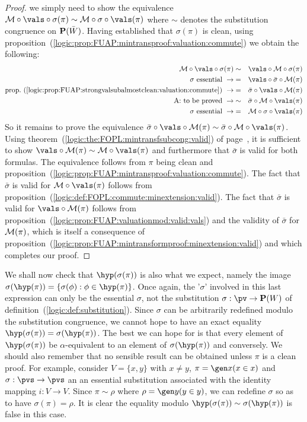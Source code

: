 \begin{proof}
we simply need to show the equivalence ${\cal
M}\circ\vals\circ\sigma(\pi)\sim{\cal M}\circ\sigma\circ\vals(\pi)$
where $\sim$ denotes the substitution congruence on ${\bf
P}(\bar{W})$. Having established that $\sigma(\pi)$ is clean, using
proposition~(\ref{logic:prop:FUAP:mintransproof:valuation:commute})
we obtain the following:
    \begin{eqnarray*}
    {\cal M}\circ\vals\circ\sigma(\pi)&\sim&\vals\circ{\cal
    M}\circ\sigma(\pi)\\
    \mbox{$\sigma$ essential}\ \rightarrow
    &=&\vals\circ\bar{\sigma}\circ{\cal M}(\pi)\\
    \mbox{prop.~(\ref{logic:prop:FUAP:strongvalsubalmostclean:valuation:commute})}\ \rightarrow
    &=&\bar{\sigma}\circ\vals\circ{\cal M}(\pi)\\
    \mbox{A: to be proved}\ \rightarrow
    &\sim&\bar{\sigma}\circ{\cal M}\circ\vals(\pi)\\
    \mbox{$\sigma$ essential}\ \rightarrow
    &=&{\cal M}\circ\sigma\circ\vals(\pi)\\
    \end{eqnarray*}
So it remains to prove the equivalence
$\bar{\sigma}\circ\vals\circ{\cal M}(\pi)\sim\bar{\sigma}\circ{\cal
M}\circ\vals(\pi)$. Using
theorem~(\ref{logic:the:FOPL:mintransfsubcong:valid}) of
page~\pageref{logic:the:FOPL:mintransfsubcong:valid}, it is
sufficient to show $\vals\circ{\cal M}(\pi)\sim{\cal
M}\circ\vals(\pi)$ and furthermore that $\bar{\sigma}$ is valid for
both formulas. The equivalence follows from $\pi$ being clean and
proposition~(\ref{logic:prop:FUAP:mintransproof:valuation:commute}).
The fact that $\bar{\sigma}$ is valid for ${\cal M}\circ\vals(\pi)$
follows from
proposition~(\ref{logic:def:FOPL:commute:minextension:valid}). The
fact that $\bar{\sigma}$ is valid for $\vals\circ{\cal M}(\pi)$
follows from
proposition~(\ref{logic:prop:FUAP:valuationmod:valid:vals}) and the
validity of $\bar{\sigma}$ for ${\cal M}(\pi)$, which is itself a
consequence of
proposition~(\ref{logic:prop:FUAP:mintransformproof:minextension:valid})
and which completes our proof.
\end{proof}

We shall now check that $\hyp(\sigma(\pi))$ is also what we expect,
namely the image
$\sigma(\hyp(\pi))=\{\sigma(\phi):\phi\in\hyp(\pi)\}$. Once again,
the '$\sigma$' involved in this last expression can only be the
essential $\sigma$, not the substitution $\sigma:\pv\to{\bf P}(W)$
of definition~(\ref{logic:def:substitution}). Since $\sigma$ can be
arbitrarily redefined modulo the substitution congruence, we cannot
hope to have an exact equality
$\hyp(\sigma(\pi))=\sigma(\hyp(\pi))$. The best we can hope for is
that every element of $\hyp(\sigma(\pi))$ be $\alpha$-equivalent to
an element of $\sigma(\hyp(\pi))$ and conversely. We should also
remember that no sensible result can be obtained unless $\pi$ is a
clean proof. For example, consider $V=\{x,y\}$ with $x\neq y$,
$\pi=\gen x(x\in x)$ and $\sigma:\pvs\to\pvs$ an an essential
substitution associated with the identity mapping $i:V\to V$. Since
$\pi\sim\rho$ where $\rho=\gen y(y\in y)$, we can redefine $\sigma$
so as to have $\sigma(\pi)=\rho$. It is clear the equality modulo
$\hyp(\sigma(\pi))\sim\sigma(\hyp(\pi))$ is false in this case.

